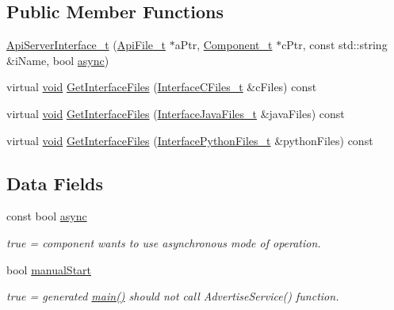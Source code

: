 \subsection*{Public Member Functions}
\begin{DoxyCompactItemize}
\item 
\hyperlink{struct_api_server_interface__t_ae332b5cb46edf97a75a17d45a5f382cc}{Api\+Server\+Interface\+\_\+t} (\hyperlink{struct_api_file__t}{Api\+File\+\_\+t} $\ast$a\+Ptr, \hyperlink{struct_component__t}{Component\+\_\+t} $\ast$c\+Ptr, const std\+::string \&i\+Name, bool \hyperlink{struct_api_server_interface__t_ac799bef1421e6d3bdb4baeabd731c07b}{async})
\item 
virtual \hyperlink{_t_e_m_p_l_a_t_e__cdef_8h_ac9c84fa68bbad002983e35ce3663c686}{void} \hyperlink{struct_api_server_interface__t_a42009329bd3535309c61510a1d587178}{Get\+Interface\+Files} (\hyperlink{struct_interface_c_files__t}{Interface\+C\+Files\+\_\+t} \&c\+Files) const 
\item 
virtual \hyperlink{_t_e_m_p_l_a_t_e__cdef_8h_ac9c84fa68bbad002983e35ce3663c686}{void} \hyperlink{struct_api_server_interface__t_a3333b1f8ecf4f97d0a1a2b0c950f3cbc}{Get\+Interface\+Files} (\hyperlink{struct_interface_java_files__t}{Interface\+Java\+Files\+\_\+t} \&java\+Files) const 
\item 
virtual \hyperlink{_t_e_m_p_l_a_t_e__cdef_8h_ac9c84fa68bbad002983e35ce3663c686}{void} \hyperlink{struct_api_server_interface__t_a6911836d458be75e890eaecced735ffd}{Get\+Interface\+Files} (\hyperlink{struct_interface_python_files__t}{Interface\+Python\+Files\+\_\+t} \&python\+Files) const 
\end{DoxyCompactItemize}
\subsection*{Data Fields}
\begin{DoxyCompactItemize}
\item 
const bool \hyperlink{struct_api_server_interface__t_ac799bef1421e6d3bdb4baeabd731c07b}{async}
\begin{DoxyCompactList}\small\item\em true = component wants to use asynchronous mode of operation. \end{DoxyCompactList}\item 
bool \hyperlink{struct_api_server_interface__t_a5518fbb04de88731438c44b898fb271c}{manual\+Start}
\begin{DoxyCompactList}\small\item\em true = generated \hyperlink{start_8c_a3c04138a5bfe5d72780bb7e82a18e627}{main()} should not call Advertise\+Service() function. \end{DoxyCompactList}\end{DoxyCompactItemize}

